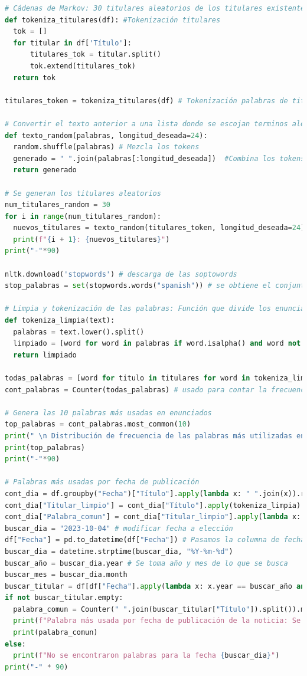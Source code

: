 \begin{lstlisting}[language=Python]
# Cádenas de Markov: 30 titulares aleatorios de los titulares existentes
def tokeniza_titulares(df): #Tokenización titulares
  tok = []
  for titular in df['Título']:
      titulares_tok = titular.split()
      tok.extend(titulares_tok)
  return tok

titulares_token = tokeniza_titulares(df) # Tokenización palabras de titulares

# Convertir el texto anterior a una lista donde se escojan terminos aleatorios
def texto_random(palabras, longitud_deseada=24):
  random.shuffle(palabras) # Mezcla los tokens
  generado = " ".join(palabras[:longitud_deseada])  #Combina los tokens
  return generado

# Se generan los titulares aleatorios
num_titulares_random = 30
for i in range(num_titulares_random):
  nuevos_titulares = texto_random(titulares_token, longitud_deseada=24)
  print(f"{i + 1}: {nuevos_titulares}")
print("-"*90)

nltk.download('stopwords') # descarga de las soptowords
stop_palabras = set(stopwords.words("spanish")) # se obtiene el conjunto de palabras vacías 

# Limpia y tokenización de las palabras: Función que divide los enunciados en palabras y elimina las palabras vacías.
def tokeniza_limpia(text):
  palabras = text.lower().split()
  limpiado = [word for word in palabras if word.isalpha() and word not in stop_palabras]
  return limpiado

todas_palabras = [word for titulo in titulares for word in tokeniza_limpia(titulo['Título'])]
cont_palabras = Counter(todas_palabras) # usado para contar la frecuencia de las palabras limpias.

# Genera las 10 palabras más usadas en enunciados
top_palabras = cont_palabras.most_common(10)
print(" \n Distribución de frecuencia de las palabras más utilizadas en todos los enunciados:")
print(top_palabras)
print("-"*90)

# Palabras más usadas por fecha de publicación
cont_dia = df.groupby("Fecha")["Título"].apply(lambda x: " ".join(x)).reset_index() # agrupa los datos por fecha y concatena los enunciados por estas
cont_dia["Titular_limpio"] = cont_dia["Título"].apply(tokeniza_limpia)
cont_dia["Palabra_comun"] = cont_dia["Titular_limpio"].apply(lambda x: Counter(x).most_common(1))
buscar_dia = "2023-10-04" # modificar fecha a elección
df["Fecha"] = pd.to_datetime(df["Fecha"]) # Pasamos la columna de fecha a objetos de fecha y hora de Pandas 
buscar_dia = datetime.strptime(buscar_dia, "%Y-%m-%d") 
buscar_año = buscar_dia.year # Se toma año y mes de lo que se busca
buscar_mes = buscar_dia.month
buscar_titular = df[df["Fecha"].apply(lambda x: x.year == buscar_año and x.month == buscar_mes)] # Filtro de titulares por año y mes
if not buscar_titular.empty:
  palabra_comun = Counter(" ".join(buscar_titular["Título"]).split()).most_common(10)
  print(f"Palabra más usada por fecha de publicación de la noticia: Se escogió la fecha {buscar_dia}:")
  print(palabra_comun)
else:
  print(f"No se encontraron palabras para la fecha {buscar_dia}")
print("-" * 90)


\end{lstlisting}
